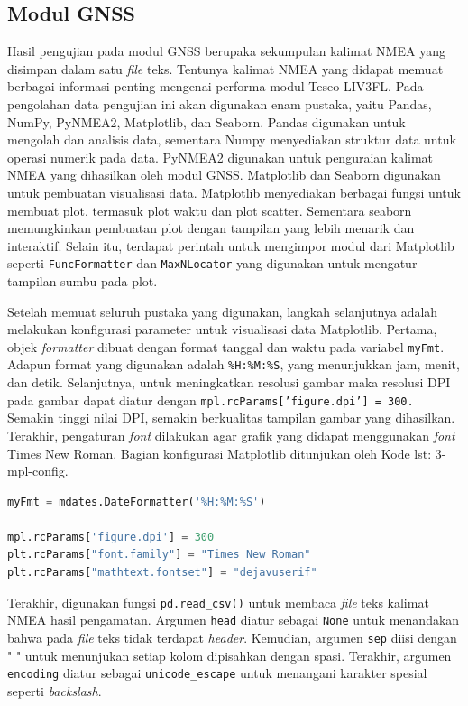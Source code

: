 \subsection{Modul GNSS}
Hasil pengujian pada modul GNSS berupaka sekumpulan kalimat NMEA yang disimpan dalam satu \textit{file} teks. Tentunya kalimat NMEA yang didapat memuat berbagai informasi penting mengenai performa modul Teseo-LIV3FL. Pada pengolahan data pengujian ini akan digunakan enam pustaka, yaitu Pandas, NumPy, PyNMEA2, Matplotlib, dan Seaborn. Pandas digunakan untuk mengolah dan analisis data, sementara Numpy menyediakan struktur data untuk operasi numerik pada data. PyNMEA2 digunakan untuk penguraian kalimat NMEA yang dihasilkan oleh modul GNSS. Matplotlib dan Seaborn digunakan untuk pembuatan visualisasi data. Matplotlib menyediakan berbagai fungsi untuk membuat plot, termasuk plot waktu dan plot scatter. Sementara seaborn memungkinkan pembuatan plot dengan tampilan yang lebih menarik dan interaktif. Selain itu, terdapat perintah untuk mengimpor modul dari Matplotlib seperti \texttt{FuncFormatter} dan \texttt{MaxNLocator} yang digunakan untuk mengatur tampilan sumbu pada plot.

Setelah memuat seluruh pustaka yang digunakan, langkah selanjutnya adalah melakukan konfigurasi parameter untuk visualisasi data Matplotlib. Pertama, objek \textit{formatter} dibuat dengan format tanggal dan waktu pada variabel \texttt{myFmt}. Adapun format yang digunakan adalah \texttt{\%H:\%M:\%S}, yang menunjukkan jam, menit, dan detik. Selanjutnya, untuk meningkatkan resolusi gambar maka resolusi DPI pada gambar dapat diatur dengan \texttt{mpl.rcParams['figure.dpi'] = 300.} Semakin tinggi nilai DPI, semakin berkualitas tampilan gambar yang dihasilkan. Terakhir, pengaturan \textit{font} dilakukan agar grafik yang didapat menggunakan \textit{font} Times New Roman. Bagian konfigurasi Matplotlib ditunjukan oleh Kode {lst: 3-mpl-config}.

\vspace{0.3cm}
\begin{lstlisting}[language=python, style=mystyle, caption={Konfigurasi Tampilan Matplotlib}, label={lst: 3-mpl-config}]
myFmt = mdates.DateFormatter('%H:%M:%S') 

mpl.rcParams['figure.dpi'] = 300
plt.rcParams["font.family"] = "Times New Roman"
plt.rcParams["mathtext.fontset"] = "dejavuserif"
\end{lstlisting}

Terakhir, digunakan fungsi \texttt{pd.read\_csv()} untuk membaca \textit{file} teks kalimat NMEA hasil pengamatan. Argumen \texttt{head} diatur sebagai \texttt{None} untuk menandakan bahwa pada \textit{file} teks tidak terdapat \textit{header}. Kemudian, argumen \texttt{sep} diisi dengan " 
" untuk menunjukan setiap kolom dipisahkan dengan spasi. Terakhir, argumen \texttt{encoding} diatur sebagai \texttt{unicode\_escape} untuk menangani karakter spesial seperti \textit{backslash}.

